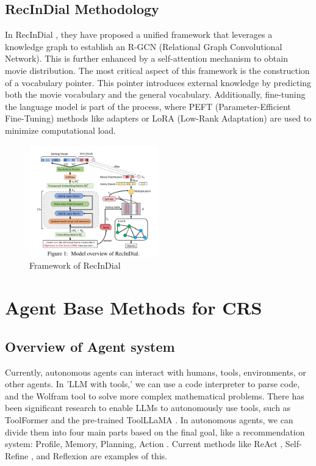 \documentclass[11pt]{article}
\begin{document}

\subsection{RecInDial Methodology}
In RecInDial \citet{wangRecInDialUnifiedFramework2022}, they have proposed a unified framework that leverages a knowledge graph to establish an R-GCN (Relational Graph Convolutional Network). This is further enhanced by a self-attention mechanism to obtain movie distribution. The most critical aspect of this framework is the construction of a vocabulary pointer. This pointer introduces external knowledge by predicting both the movie vocabulary and the general vocabulary. Additionally, fine-tuning the language model is part of the process, where PEFT (Parameter-Efficient Fine-Tuning) methods like adapters or LoRA (Low-Rank Adaptation) are used to minimize computational load.

\begin{figure}
    \centering
    \includegraphics[width=0.5\textwidth]{images/image-20231224144744321.png}
    \caption{Framework of RecInDial \citet{wangRecInDialUnifiedFramework2022}}
    \label{fig:RecIndial}
\end{figure}



\section{Agent Base Methods for CRS}
\subsection{Overview of Agent system}
Currently, autonomous agents can interact with humans, tools, environments, or other agents. In 'LLM with tools,' we can use a code interpreter to parse code, and the Wolfram tool to solve more complex mathematical problems. There has been significant research to enable LLMs to autonomously use tools, such as ToolFormer \cite{schick2023toolformer} and the pre-trained ToolLLaMA \cite{qin2023toolllm}. In autonomous agents, we can divide them into four main parts based on the final goal, like a recommendation system: Profile, Memory, Planning, Action \cite{wang2023survey}. Current methods like ReAct \cite{yao2023react}, Self-Refine \cite{madaan2023selfrefine}, and Reflexion \cite{shinn2023reflexion} are examples of this.
\end{document}
